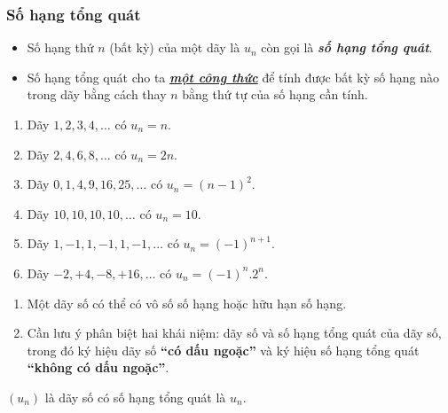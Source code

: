 \subsubsection{Số hạng tổng quát}
\begin{itemize}
\item Số hạng thứ  $n$ (bất kỳ) của một  dãy là $u_n$  còn gọi là \textbf{\textit{số hạng tổng quát}}.
\item Số hạng tổng quát cho ta \underline{\textit{\textbf{một công thức}}} để tính được bất kỳ số hạng nào trong dãy bằng cách thay $n$ bằng thứ tự của số hạng cần tính.
\end{itemize}
\begin{vd}\hfill
\begin{enumerate}
\item Dãy $1,2,3,4,\ldots$ có $u_n=n$.
\item Dãy $2,4,6,8,\ldots$ có $u_n=2n$.
\item Dãy  $0,1,4,9,16,25,\ldots$ có $u_n=(n-1)^2$.
\item Dãy $10,10,10,10,\ldots$ có $u_n=10$.
\item Dãy $1,-1,1,-1,1,-1,\ldots$ có $u_n=(-1)^{n+1}$.
\item Dãy $-2,+4,-8,+16,\ldots$ có $u_n=(-1)^n.2^n$.
\end{enumerate}
\end{vd}
\begin{note}\hfill
	\begin{enumerate}
		\item Một dãy số có thể có vô số số hạng hoặc hữu hạn số hạng.
\item Cần lưu ý phân biệt hai khái niệm: dãy số và số hạng tổng quát của dãy số, trong đó ký hiệu dãy số \textbf{“có dấu ngoặc”} và ký hiệu số hạng tổng quát \textbf{“không có dấu ngoặc”}. 
		\end{enumerate}
\end{note}
\begin{vd}
	$(u_n)$ là dãy số có số hạng tổng quát là $u_n$.
\end{vd}
